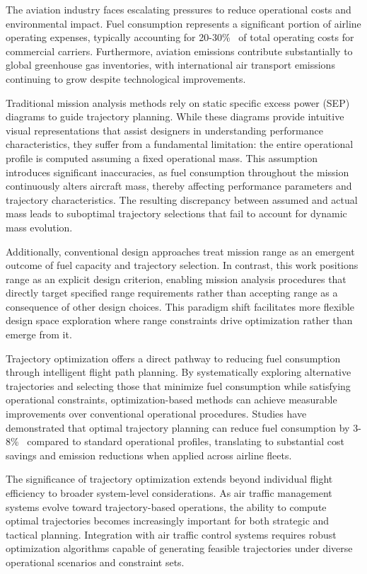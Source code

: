 
The aviation industry faces escalating pressures to reduce operational costs and environmental impact. Fuel consumption represents a significant portion of airline operating expenses, typically accounting for 20-30\%~\cite{} of total operating costs for commercial carriers. Furthermore, aviation emissions contribute substantially to global greenhouse gas inventories, with international air transport emissions continuing to grow despite technological improvements.

Traditional mission analysis methods rely on static specific excess power (SEP) diagrams to guide trajectory planning. While these diagrams provide intuitive visual representations that assist designers in understanding performance characteristics, they suffer from a fundamental limitation: the entire operational profile is computed assuming a fixed operational mass. This assumption introduces significant inaccuracies, as fuel consumption throughout the mission continuously alters aircraft mass, thereby affecting performance parameters and trajectory characteristics. The resulting discrepancy between assumed and actual mass leads to suboptimal trajectory selections that fail to account for dynamic mass evolution.

Additionally, conventional design approaches treat mission range as an emergent outcome of fuel capacity and trajectory selection. In contrast, this work positions range as an explicit design criterion, enabling mission analysis procedures that directly target specified range requirements rather than accepting range as a consequence of other design choices. This paradigm shift facilitates more flexible design space exploration where range constraints drive optimization rather than emerge from it.

Trajectory optimization offers a direct pathway to reducing fuel consumption through intelligent flight path planning. By systematically exploring alternative trajectories and selecting those that minimize fuel consumption while satisfying operational constraints, optimization-based methods can achieve measurable improvements over conventional operational procedures. Studies have demonstrated that optimal trajectory planning can reduce fuel consumption by 3-8\%~\cite{} compared to standard operational profiles, translating to substantial cost savings and emission reductions when applied across airline fleets.

The significance of trajectory optimization extends beyond individual flight efficiency to broader system-level considerations. As air traffic management systems evolve toward trajectory-based operations, the ability to compute optimal trajectories becomes increasingly important for both strategic and tactical planning. Integration with air traffic control systems requires robust optimization algorithms capable of generating feasible trajectories under diverse operational scenarios and constraint sets.


